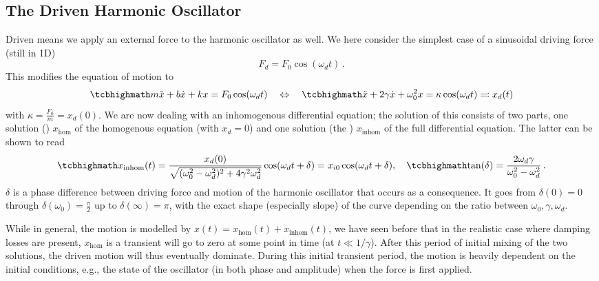 \documentclass[../class_mech_main.tex]{subfiles}
\begin{document}
		\subsection{The Driven Harmonic Oscillator}
Driven means we apply an external force to the harmonic oscillator as well. We here consider the simplest case of a sinusoidal driving force (still in 1D)
\begin{equation}
	F_d = F_0 \cos(\omega_d t) \, .
\end{equation}
This modifies the equation of motion to
\begin{equation}
	\eqbox{
		m \ddot{x} + b \dot{x} + k x = F_0 \cos(\omega_d t)
	}
	\quad \Leftrightarrow \quad
	\eqbox{
		\ddot{x} + 2 \gamma \dot{x} + \omega_0^2 x = \kappa \cos(\omega_d t) \eqqcolon x_d(t)
	}
\end{equation}
with $\kappa = \frac{F_0}{m} = x_d(0)$. We are now dealing with an inhomogenous differential equation; the solution of this consists of two parts, one solution () $x_\mathrm{hom}$ of the homogenous equation (with $x_d = 0$) and one solution (the ) $x_\mathrm{inhom}$ of the full differential equation. The latter can be shown to read
\begin{equation}\label{eq:driven_harm_osc_params}
	\eqbox{
		x_\mathrm{inhom}(t) = \frac{x_d(0)}{\sqrt{(\omega_0^2 - \omega_d^2)^2 + 4 \gamma^2 \omega_d^2}} \cos(\omega_d t + \delta) = x_{i0} \cos(\omega_d t + \delta)
	}, \quad
	\eqbox{
		\tan(\delta) = \frac{2 \omega_d \gamma}{\omega_0^2 - \omega_d^2}
	} \, .
\end{equation}
$\delta$ is a phase difference between driving force and motion of the harmonic oscillator that occurs as a consequence. It goes from $\delta(0) = 0$ through $\delta(\omega_0) = \frac{\pi}{2}$ up to $\delta(\infty) = \pi$, with the exact shape (especially slope) of the curve depending on the ratio between $\omega_0, \gamma, \omega_d$.

While in general, the motion is modelled by $x(t) = x_\mathrm{hom}(t) + x_\mathrm{inhom}(t)$, we have seen before that in the realistic case where damping losses are present, $x_\mathrm{hom}$ is a transient will go to zero at some point in time (at $t \ll 1/\gamma$). After this period of initial mixing of the two solutions, the driven motion will thus eventually dominate. During this initial transient period, the motion is heavily dependent on the initial conditions, e.g., the state of the oscillator (in both phase and amplitude) when the force is first applied.
\end{document}
